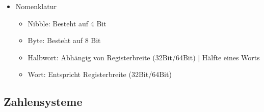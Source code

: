 \documentclass[11pt,a4paper]{article}
\begin{document}
\begin{itemize}
\begin{itemize}
	\item Nomenklatur
		\begin{itemize}
		\item Nibble: Besteht auf 4 Bit
		\item Byte: Besteht auf 8 Bit
		\item Halbwort: Abhängig von Registerbreite (32Bit/64Bit) | Hälfte eines Worts
		\item Wort: Entspricht Registerbreite (32Bit/64Bit)
		\end{itemize}
	\end{itemize}
	
	
\end{itemize}

\subsection{Zahlensysteme}
\end{document}
